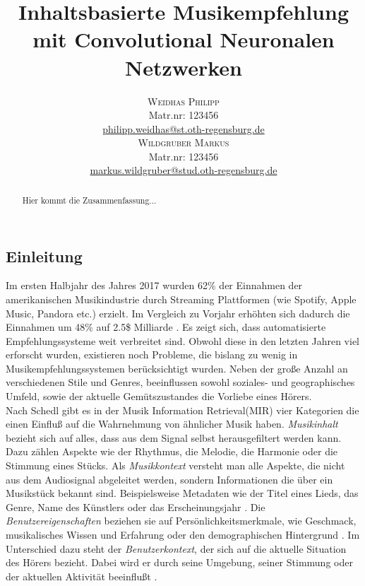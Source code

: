 \documentclass[twosided,a4,10pt]{article}
\title{\vspace{-5mm}%
	\fontsize{20pt}{10pt}\selectfont
	\textbf{Inhaltsbasierte Musikempfehlung mit Convolutional Neuronalen Netzwerken}
	}
\author{
	\large\begin{minipage}[t]{0.5\linewidth}
		\begin{center}
			\textsc{Weidhas Philipp}\\[2mm]
			\normalsize	Matr.nr: 123456\\
			\normalsize
			\href{mailto:philipp.weidhas@st.oth-regensburg.de}
			{philipp.weidhas@st.oth-regensburg.de}      
		\end{center}
	\end{minipage}        
	\begin{minipage}[t]{0.5\linewidth}
         \begin{center}
           	\textsc{Wildgruber Markus}\\[2mm]
                 \normalsize	Matr.nr: 123456\\
                 \normalsize
                 \href{mailto:markus.wildgruber@stud.oth-regensburg.de}
                 {markus.wildgruber@stud.oth-regensburg.de}      
         \end{center}
       \end{minipage}
     }
\begin{document}
\maketitle
\thispagestyle{fancy}

	

\begin{multicols}{2}

\begin{abstract}
\noindent Hier kommt die Zusammenfassung...
\end{abstract}


\section{Einleitung}
Im ersten Halbjahr des Jahres 2017 wurden 62\% der Einnahmen der amerikanischen Musikindustrie durch Streaming Plattformen (wie Spotify, Apple Music, Pandora etc.) erzielt. Im Vergleich zu Vorjahr erhöhten sich dadurch die Einnahmen um 48\% auf 2.5\$ Milliarde \cite{friedlander}\cite{rys}. Es zeigt sich, dass automatisierte Empfehlungssysteme weit verbreitet sind.\newline
Obwohl diese in den letzten Jahren viel erforscht wurden, existieren noch Probleme, die bislang zu wenig in Musikempfehlungssystemen berücksichtigt wurden. Neben der große Anzahl an verschiedenen Stile und Genres, beeinflussen sowohl soziales- und geographisches Umfeld, sowie der aktuelle Gemütszustandes die Vorliebe eines Hörers. \cite{oord}\newline\\
Nach Schedl \cite{schedl} gibt es in der Musik Information Retrieval(MIR) vier Kategorien die einen Einfluß auf die Wahrnehmung von ähnlicher Musik haben. \textit{Musikinhalt} bezieht sich auf alles, dass aus dem Signal selbst herausgefiltert werden kann. Dazu zählen Aspekte wie der Rhythmus, die Melodie, die Harmonie oder die Stimmung eines Stücks.\cite{knees}\newline
Als \textit{Musikkontext} versteht man alle Aspekte, die nicht aus dem Audiosignal abgeleitet werden, sondern Informationen die über ein Musikstück bekannt sind. Beispielsweise Metadaten wie der Titel eines Lieds, das Genre, Name des Künstlers oder das Erscheinungsjahr \cite{knees}.\newline
Die \textit{Benutzereigenschaften} beziehen sie auf Persönlichkeitsmerkmale, wie Geschmack, musikalisches Wissen und Erfahrung oder den demographischen Hintergrund \cite{knees}.\newline
Im Unterschied dazu steht der \textit{Benutzerkontext}, der sich auf die aktuelle Situation des Hörers bezieht. Dabei wird er durch seine Umgebung, seiner Stimmung oder der aktuellen Aktivität beeinflußt \cite{knees}.\newline

\end{multicols}
\end{document}

